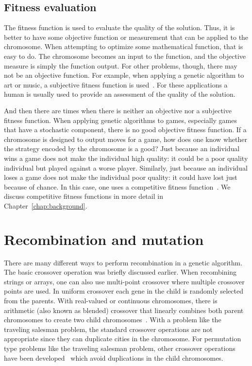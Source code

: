 \subsection{Fitness evaluation}

The fitness function is used to evaluate the quality of the solution. Thus, it
is better to have some objective function or measurement that can be applied to
the chromosome. When attempting to optimize some mathematical function, that is
easy to do. The chromosome becomes an input to the function, and the objective
measure is simply the function output. For other problems, though, there may not
be an objective function. For example, when applying a genetic algorithm to art
or music, a subjective fitness function is used~\cite{eiben2003introduction}.
For these applications a human is usually used to provide an assessment of the
quality of the solution.

And then there are times when there is neither an objective nor a subjective
fitness function. When applying genetic algorithms to games, especially games
that have a stochastic component, there is no good objective fitness function.
If a chromosome is designed to output moves for a game, how does one know
whether the strategy encoded by the chromosome is a good? Just because an
individual wins a game does not make the individual high quality: it could be a
poor quality individual but played against a worse player. Similarly, just
because an individual loses a game does not make the individual poor quality: it
could have lost just because of chance. In this case, one uses a competitive
fitness function~\cite{fogel1999intelligence}. We discuss competitive fitness 
functions in more detail in Chapter~\ref{chap:background}.

\section{Recombination and mutation} \label{2-recombination}

There are many different ways to perform recombination in a genetic algorithm.
The basic crossover operation was briefly discussed earlier. When recombining
strings or arrays, one can also use multi-point crossover where multiple
crossover points are used. In uniform crossover each gene in the child is
randomly selected from the parents. With real-valued or continuous chromosomes,
there is arithmetic (also known as blended) crossover that linearly combines
both parent chromosomes to create two child
chromosomes~\cite{haupt2004practical}. With a problem like the traveling
salesman problem, the standard crossover operations are not appropriate since
they can duplicate cities in the chromosome. For permutation type problems like
the traveling salesman problem, other crossover operations have been
developed~\cite{goldberg1989genetic} which avoid duplications in the child
chromosomes.

